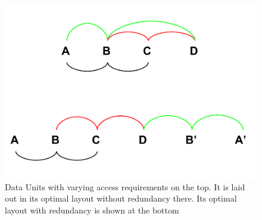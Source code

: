 \begin{figure}[h!]
\centering
\includegraphics[width=\columnwidth]{DataLayoutPaper_TheoryLayouts.pdf}
\caption{Data Units with varying access requirements on the top. It is laid out in its optimal layout without redundancy there. Its optimal layout with redundancy is shown at the bottom}
\label{fig:startingProb}
\end{figure}

